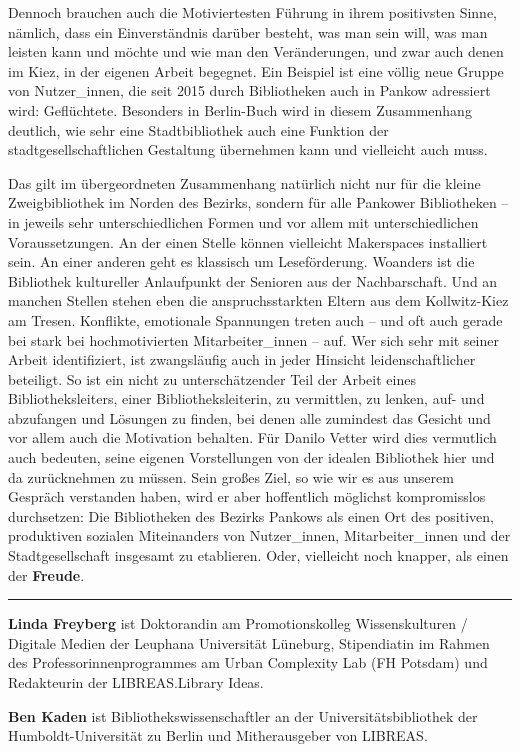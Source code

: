 \documentclass[a4paper,
fontsize=11pt,
oneside,
numbers=noperiodatend,
parskip=half-,
bibliography=totoc,
final
]{scrartcl}
\begin{document}
Dennoch brauchen auch die Motiviertesten Führung in ihrem positivsten
Sinne, nämlich, dass ein Einverständnis darüber besteht, was man sein
will, was man leisten kann und möchte und wie man den Veränderungen, und
zwar auch denen im Kiez, in der eigenen Arbeit begegnet. Ein Beispiel
ist eine völlig neue Gruppe von Nutzer\_innen, die seit 2015 durch
Bibliotheken auch in Pankow adressiert wird: Geflüchtete. Besonders in
Berlin-Buch wird in diesem Zusammenhang deutlich, wie sehr eine
Stadtbibliothek auch eine Funktion der stadtgesellschaftlichen
Gestaltung übernehmen kann und vielleicht auch muss.

Das gilt im übergeordneten Zusammenhang natürlich nicht nur für die
kleine Zweigbibliothek im Norden des Bezirks, sondern für alle Pankower
Bibliotheken -- in jeweils sehr unterschiedlichen Formen und vor allem
mit unterschiedlichen Voraussetzungen. An der einen Stelle können
vielleicht Makerspaces installiert sein. An einer anderen geht es
klassisch um Leseförderung. Woanders ist die Bibliothek kultureller
Anlaufpunkt der Senioren aus der Nachbarschaft. Und an manchen Stellen
stehen eben die anspruchsstarkten Eltern aus dem Kollwitz-Kiez am
Tresen. Konflikte, emotionale Spannungen treten auch -- und oft auch
gerade bei stark bei hochmotivierten Mitarbeiter\_innen -- auf. Wer sich
sehr mit seiner Arbeit identifiziert, ist zwangsläufig auch in jeder
Hinsicht leidenschaftlicher beteiligt. So ist ein nicht zu
unterschätzender Teil der Arbeit eines Bibliotheksleiters, einer
Bibliotheksleiterin, zu vermittlen, zu lenken, auf- und abzufangen und
Lösungen zu finden, bei denen alle zumindest das Gesicht und vor allem
auch die Motivation behalten. Für Danilo Vetter wird dies vermutlich
auch bedeuten, seine eigenen Vorstellungen von der idealen Bibliothek
hier und da zurücknehmen zu müssen. Sein großes Ziel, so wie wir es aus
unserem Gespräch verstanden haben, wird er aber hoffentlich möglichst
kompromisslos durchsetzen: Die Bibliotheken des Bezirks Pankows als
einen Ort des positiven, produktiven sozialen Miteinanders von
Nutzer\_innen, Mitarbeiter\_innen und der Stadtgesellschaft insgesamt zu
etablieren. Oder, vielleicht noch knapper, als einen der
\textbf{Freude}.

\begin{center}\rule{0.5\linewidth}{\linethickness}\end{center}

\textbf{Linda Freyberg} ist Doktorandin am Promotionskolleg
Wissenskulturen / Digitale Medien der Leuphana Universität Lüneburg,
Stipendiatin im Rahmen des Professorinnenprogrammes am Urban Complexity
Lab (FH Potsdam) und Redakteurin der LIBREAS.Library Ideas.

\textbf{Ben Kaden} ist Bibliothekswissenschaftler an der
Universitätsbibliothek der Humboldt-Universität zu Berlin und
Mitherausgeber von LIBREAS.
\end{document}
